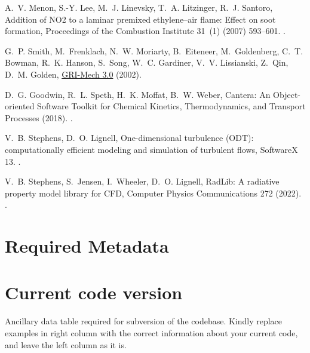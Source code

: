 \documentclass[preprint,letterpaper]{elsarticle}
\begin{document}
\begin{thebibliography}{00}
A.~V. Menon, S.-Y. Lee, M.~J. Linevsky, T.~A. Litzinger, R.~J. Santoro,
{Addition of NO2 to a laminar premixed ethylene--air flame: Effect on soot
formation}, {Proceedings of the Combustion Institute} 31~(1) (2007) 593--601.
\newblock \href {http://dx.doi.org/10.1016/j.proci.2006.08.105}
  {}.

G.~P. Smith, M.~Frenklach, N.~W. Moriarty, B.~Eiteneer, M.~Goldenberg, C.~T.
Bowman, R.~K. Hanson, S.~Song, W.~C. Gardiner, V.~V. Lissianski, Z.~Qin,
D.~M. Golden, \href{http://combustion.berkeley.edu/gri-mech/}{{GRI-Mech 3.0}}
(2002).

D.~G. Goodwin, R.~L. Speth, H.~K. Moffat, B.~W. Weber, {Cantera: An
Object-oriented Software Toolkit for Chemical Kinetics, Thermodynamics, and
Transport Processes} (2018).
\newblock \href {http://dx.doi.org/10.5281/zenodo.1174508}
  {}.

V.~B. Stephens, D.~O. Lignell, {One-dimensional turbulence ({ODT}):
computationally efficient modeling and simulation of turbulent flows},
{SoftwareX} 13.
\newblock \href {http://dx.doi.org/10.1016/j.softx.2020.100641}
  {}.

V.~B. Stephens, S.~Jensen, I.~Wheeler, D.~O. Lignell, {RadLib: A radiative
property model library for CFD}, {Computer Physics Communications} 272 (2022).
\newblock \href {http://dx.doi.org/10.1016/j.cpc.2021.108227}
  {}.

\end{thebibliography}


\section*{Required Metadata}

\section*{Current code version}

Ancillary data table required for subversion of the codebase. Kindly replace examples in right column with the correct information about your current code, and leave the left column as it is.
\end{document}
